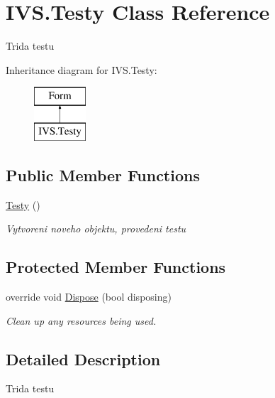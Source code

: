 \hypertarget{class_i_v_s_1_1_testy}{}\section{I\+V\+S.\+Testy Class Reference}
\label{class_i_v_s_1_1_testy}


Trida testu  


Inheritance diagram for I\+V\+S.\+Testy\+:\begin{figure}[H]
\begin{center}
\leavevmode
\includegraphics[height=2.000000cm]{class_i_v_s_1_1_testy}
\end{center}
\end{figure}
\subsection*{Public Member Functions}
\begin{DoxyCompactItemize}
\item 
\mbox{\hyperlink{class_i_v_s_1_1_testy_aa23cf506d76f5bc99002eeae9fd2f91c}{Testy}} ()
\begin{DoxyCompactList}\small\item\em Vytvoreni noveho objektu, provedeni testu \end{DoxyCompactList}\end{DoxyCompactItemize}
\subsection*{Protected Member Functions}
\begin{DoxyCompactItemize}
\item 
override void \mbox{\hyperlink{class_i_v_s_1_1_testy_a231cc8b0d786365ab6a36d8e7ef902aa}{Dispose}} (bool disposing)
\begin{DoxyCompactList}\small\item\em Clean up any resources being used. \end{DoxyCompactList}\end{DoxyCompactItemize}


\subsection{Detailed Description}
Trida testu 



